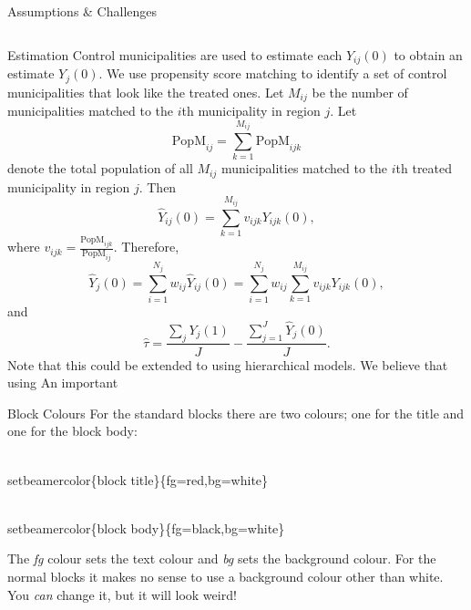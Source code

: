 \documentclass[final]{beamer}
\newlength{\onecolwid}
\newlength{\threecolwid}
\begin{document}
\begin{frame}[t]
\begin{columns}[t]
\begin{column}{\threecolwid}
\begin{block}{Assumptions \& Challenges}
      
  \end{block}
      \begin{columns}[t,totalwidth=\threecolwid]	%
        \begin{column}{\onecolwid}
			      \begin{block}{Estimation}
					Control municipalities are used to estimate each $Y_{ij}(0)$ to obtain an estimate $Y_j(0)$. We use propensity score matching to identify a set of control municipalities that look like the treated ones.
					Let $M_{ij}$ be the number of municipalities matched to the $i$th municipality in region $j$. Let $$\textrm{PopM}_{ij}=\sum_{k=1}^{M_{ij}}\textrm{PopM}_{ijk}$$ denote the total population of all $M_{ij}$ municipalities matched to the $i$th treated municipality in region $j$. Then 
					$$\hat{Y}_{ij}(0) =\sum_{k=1}^{M_{ij}}v_{ijk}Y_{ijk}(0),$$ where $v_{ijk}=\frac{\textrm{PopM}_{ijk}}{\textrm{PopM}_{ij}}.$
					Therefore,
					$$\hat{Y}_{j}(0) =\sum_{i=1}^{N_j}w_{ij}\hat{Y}_{ij}(0)=\sum_{i=1}^{N_j}w_{ij}\sum_{k=1}^{M_{ij}}v_{ijk}Y_{ijk}(0),$$
					and
					$$\hat{\tau}=\frac{\sum_j Y_j(1)}{J}-\frac{\sum_{j=1}^{J}\hat{Y}_j(0)}{J}.$$
			Note that this could be extended to using hierarchical models. We believe that using 
			An important 	
			      \end{block}
          \begin{block}{Block Colours}
            For the standard blocks there are two colours; one for the title and one for the block body:\\
            \begin{semiverbatim}
              {\color{red}\\setbeamercolor}\{block title\}\newline \{fg=red,bg=white\}
            \end{semiverbatim}
            \begin{semiverbatim}
              {\color{red}\\setbeamercolor}\{block  body\}\newline \{fg=black,bg=white\}
            \end{semiverbatim}
            The \emph{fg} colour sets the text colour and \emph{bg} sets the background colour.
            For the normal blocks it makes no sense to use a background colour other than white. You \emph{can} change it, but it will look weird!
          \end{block}

\end{column}
\end{columns}
\end{column}
\end{columns}
\end{frame}
\end{document}
